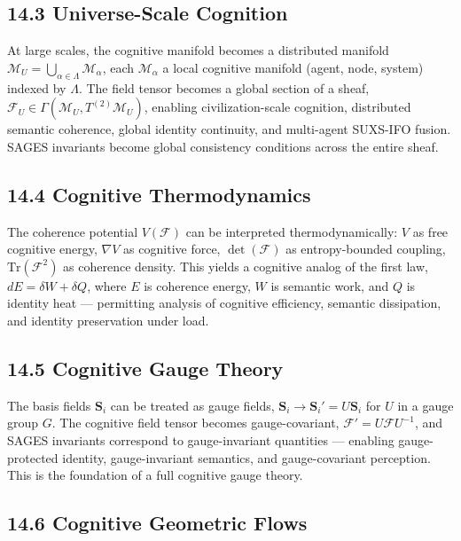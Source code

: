 \subsection{14.3 Universe-Scale Cognition}\label{universe-scale-cognition}

At large scales, the cognitive manifold becomes a distributed manifold \(\mathcal{M}_U = \bigcup_{\alpha \in \Lambda} \mathcal{M}_\alpha\), each \(\mathcal{M}_\alpha\) a local cognitive manifold (agent, node, system) indexed by \(\Lambda\). The field tensor becomes a global section of a sheaf, \(\mathcal{F}_U \in \Gamma(\mathcal{M}_U, T^{(2)}\mathcal{M}_U)\), enabling civilization-scale cognition, distributed semantic coherence, global identity continuity, and multi-agent SUXS-IFO fusion. SAGES invariants become global consistency conditions across the entire sheaf.

\subsection{14.4 Cognitive Thermodynamics}\label{cognitive-thermodynamics}

The coherence potential \(V(\mathcal{F})\) can be interpreted thermodynamically: \(V\) as free cognitive energy, \(\nabla V\) as cognitive force, \(\det(\mathcal{F})\) as entropy-bounded coupling, \(\mathrm{Tr}(\mathcal{F}^2)\) as coherence density. This yields a cognitive analog of the first law, \(dE = \delta W + \delta Q\), where \(E\) is coherence energy, \(W\) is semantic work, and \(Q\) is identity heat --- permitting analysis of cognitive efficiency, semantic dissipation, and identity preservation under load.

\subsection{14.5 Cognitive Gauge Theory}\label{cognitive-gauge-theory}

The basis fields \(\mathbf{S}_i\) can be treated as gauge fields, \(\mathbf{S}_i \rightarrow \mathbf{S}_i' = U \mathbf{S}_i\) for \(U\) in a gauge group \(G\). The cognitive field tensor becomes gauge-covariant, \(\mathcal{F}' = U \mathcal{F} U^{-1}\), and SAGES invariants correspond to gauge-invariant quantities --- enabling gauge-protected identity, gauge-invariant semantics, and gauge-covariant perception. This is the foundation of a full cognitive gauge theory.

\subsection{14.6 Cognitive Geometric Flows}\label{cognitive-geometric-flows}

